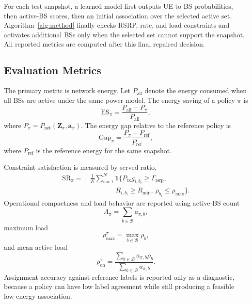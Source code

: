 \documentclass[journal]{IEEEtran}
\begin{document}
For each test snapshot, a learned model first outputs UE-to-BS probabilities,
then active-BS scores, then an initial association over the selected active set.
Algorithm~\ref{alg:method} finally checks RSRP, rate, and load constraints and
activates additional BSs only when the selected set cannot support the
snapshot. All reported metrics are computed after this final repaired decision.

\subsection{Evaluation Metrics}
The primary metric is network energy. Let
$P_{\mathrm{all}}$ denote the energy consumed when all BSs are active under the
same power model. The energy saving of a policy $\pi$ is
\begin{equation}
    \mathrm{ES}_{\pi}
    =
    \frac{P_{\mathrm{all}}-P_{\pi}}{P_{\mathrm{all}}},
    \label{eq:energy_saving_metric}
\end{equation}
where $P_{\pi}=P_{\mathrm{net}}(\mathbf{Z}_{\pi},\mathbf{a}_{\pi})$. The
energy gap relative to the reference policy is
\begin{equation}
    \mathrm{Gap}_{\pi}
    =
    \frac{P_{\pi}-P_{\mathrm{ref}}}{P_{\mathrm{ref}}},
    \label{eq:oracle_gap_metric}
\end{equation}
where $P_{\mathrm{ref}}$ is the reference energy for the same snapshot.

Constraint satisfaction is measured by served ratio,
\begin{align}
    \mathrm{SR}_{\pi}
    =&\ \frac{1}{N}\sum_{i=1}^{N}
    \mathbf{1}\Big\{
    P_{\mathrm{tx}}g_{i,b_i}\geq\Gamma_{\mathrm{rsrp}},
    \nonumber\\
    &\qquad\qquad
    R_{i,b_i}\geq R_{\min},
    \ \rho_{b_i}\leq\rho_{\max}
    \Big\}.
    \label{eq:served_ratio_metric}
\end{align}
Operational compactness and load behavior are reported using active-BS count
\begin{equation}
    A_{\pi}=\sum_{b\in\mathcal{B}}a_{\pi,b},
\end{equation}
maximum load
\begin{equation}
    \rho_{\max}^{\pi}=\max_{b\in\mathcal{B}}\rho_b,
\end{equation}
and mean active load
\begin{equation}
    \bar{\rho}_{\mathrm{on}}^{\pi}
    =
    \frac{\sum_{b\in\mathcal{B}}a_{\pi,b}\rho_b}
    {\sum_{b\in\mathcal{B}}a_{\pi,b}}.
\end{equation}
Assignment accuracy against reference labels is reported only as a diagnostic,
because a policy can have low label agreement while still producing a feasible
low-energy association.
\end{document}
